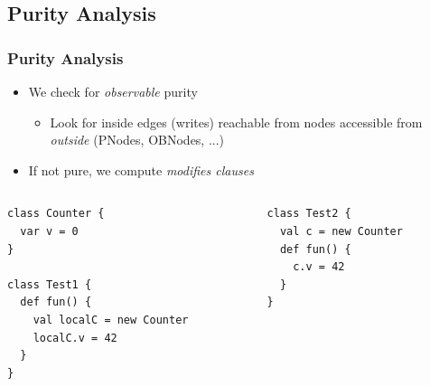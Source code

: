 \documentclass[hyperref={pdfpagelabels=false}]{beamer}
\begin{document}
\subsection{Purity Analysis}
\begin{frame}[fragile]
    \frametitle{Purity Analysis}
    \begin{itemize}
        \item We check for \emph{observable} purity
            \begin{itemize}
                \item Look for inside edges (writes) reachable from nodes
accessible from \emph{outside} (PNodes, OBNodes, ...)
            \end{itemize}
        \item If not pure, we compute \emph{modifies clauses}
    \end{itemize}

    \begin{columns}
      \begin{column}{0.5\textwidth}
\begin{lstlisting}
class Counter {
  var v = 0
}

class Test1 {
  def fun() {
    val localC = new Counter
    localC.v = 42
  }
}
\end{lstlisting}
      \end{column}
      \begin{column}{0.5\textwidth}
\begin{lstlisting}
class Test2 {
  val c = new Counter
  def fun() {
    c.v = 42
  }
}
\end{lstlisting}
      \end{column}
    \end{columns}
\end{frame}
\end{document}
